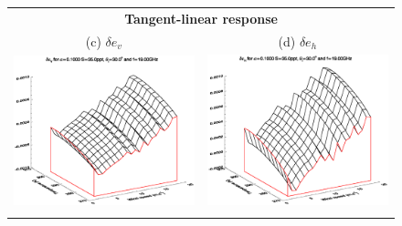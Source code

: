 \begin{figure}[htp]
\begin{tabular}{c c}
    \multicolumn{2}{c}{\sffamily\textbf{Tangent-linear response}}\\
    \textsf{(c)} $\delta e_v$ &
    \textsf{(d)} $\delta e_h$ \\
    \includegraphics[bb=110 240 508 540,clip,scale=0.5]{graphics/Model/FWDTL/Initial/TLdev_a0.1000_s35.0ppt_z30.0_19.00GHz.eps} &
    \includegraphics[bb=110 240 508 540,clip,scale=0.5]{graphics/Model/FWDTL/Initial/TLdeh_a0.1000_s35.0ppt_z30.0_19.00GHz.eps} \\\\

\end{tabular}
\end{figure}

